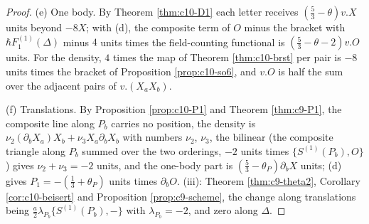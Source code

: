 \begin{proof}
(e) One body. By Theorem \ref{thm:c10-D1} each letter receives $(\tfrac53-\theta)v.X$ units beyond $-8X$; with (d), the composite term of $O$ minus the bracket with $\hbar F_1^{(1)}(\Delta)$ minus $4$ units times the field-counting functional is $(\tfrac53-\theta-2)v.O$ units. For the density, $4$ times the map of Theorem \ref{thm:c10-brst} per pair is $-8$ units times the bracket of Proposition \ref{prop:c10-so6}, and $v.O$ is half the sum over the adjacent pairs of $v.(X_aX_b)$.

(f) Translations. By Proposition \ref{prop:c10-P1} and Theorem \ref{thm:c9-P1}, the composite line along $P_b$ carries no position, the density is $\nu_2(\partial_bX_a)X_b+\nu_3X_a\partial_bX_b$ with numbers $\nu_2$, $\nu_3$, the bilinear (the composite triangle along $P_b$ summed over the two orderings, $-2$ units times $\{S^{(1)}(P_b),O\}$) gives $\nu_2+\nu_3=-2$ units, and the one-body part is $(\tfrac53-\theta_P)\partial_bX$ units; (d) gives $P_1=-(\tfrac13+\theta_P)$ units times $\partial_bO$. (iii): Theorem \ref{thm:c9-theta2}, Corollary \ref{cor:c10-beisert} and Proposition \ref{prop:c9-scheme}, the change along translations being $\tfrac a2\lambda_{P_b}\{S^{(1)}(P_b),-\}$ with $\lambda_{P_b}=-2$, and zero along $\Delta$.
\end{proof}
